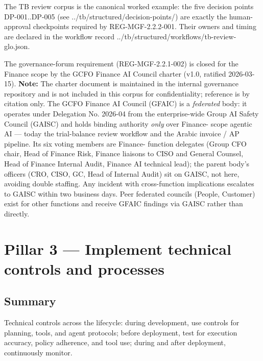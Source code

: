 \documentclass[11pt,a4paper,twoside]{report}
\newcommand{\corpus}{}
\begin{document}
The TB review corpus is the canonical worked example: the five decision
points DP-001..DP-005 (see \corpus{../tb/structured/decision-points/})
are exactly the human-approval checkpoints required by
REG-MGF-2.2.2-001.  Their owners and timing are declared in the workflow
record \corpus{../tb/structured/workflows/tb-review-glo.json}.

The governance-forum requirement (REG-MGF-2.2.1-002) is closed for the
Finance scope by the GCFO Finance AI Council charter (v1.0, ratified
2026-03-15). \textbf{Note:} The charter document is maintained in the
internal governance repository and is not included in this corpus for
confidentiality; reference is by citation only. The GCFO Finance AI
Council (GFAIC) is a \emph{federated} body: it operates under
Delegation No. 2026-04 from the enterprise-wide Group AI Safety
Council (GAISC) and holds binding authority \emph{only} over Finance-
scope agentic AI --- today the trial-balance review workflow and the
Arabic invoice / AP pipeline. Its six voting members are Finance-
function delegates (Group CFO chair, Head of Finance Risk, Finance
liaisons to CISO and General Counsel, Head of Finance Internal Audit,
Finance AI technical lead); the parent body's officers (CRO, CISO,
GC, Head of Internal Audit) sit on GAISC, not here, avoiding double
staffing. Any incident with cross-function implications escalates to
GAISC within two business days. Peer federated councils (People,
Customer) exist for other functions and receive GFAIC findings via
GAISC rather than directly.

\section{Pillar 3 --- Implement technical controls and processes}
\label{sec:mgf-p3}

\subsection*{Summary}

Technical controls across the lifecycle: during development, use
controls for planning, tools, and agent protocols; before deployment,
test for execution accuracy, policy adherence, and tool use; during and
after deployment, continuously monitor.
\end{document}
